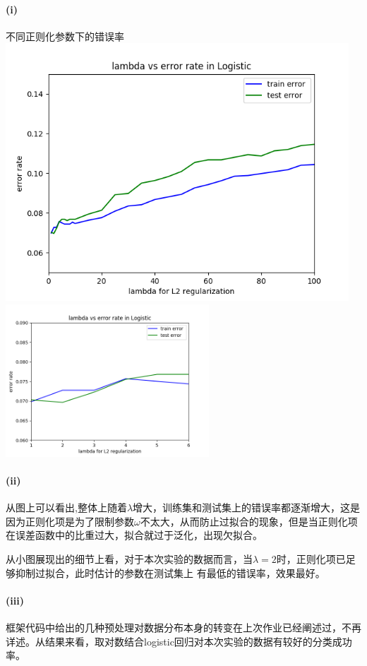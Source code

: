 \documentclass[hyperref,UTF8]{ctexart}
\begin{document}
\paragraph{(i)} 
\par 不同正则化参数下的错误率\\
\includegraphics[height=3.8in]{Logistic-lam.png}\\
\includegraphics[width=3in]{2Logistic-lam.png}
\paragraph{(ii)}从图上可以看出,整体上随着$\lambda$增大，训练集和测试集上的错误率都逐渐增大，这是因为正则化项是为了限制参数$\omega$不太大，从而防止过拟合的现象，但是当正则化项在误差函数中的比重过大，拟合就过于泛化，出现欠拟合。
\par 从小图展现出的细节上看，对于本次实验的数据而言，当$\lambda=2$时，正则化项已足够抑制过拟合，此时估计的参数在测试集上
有最低的错误率，效果最好。
\paragraph{(iii)}框架代码中给出的几种预处理对数据分布本身的转变在上次作业已经阐述过，不再详述。从结果来看，取对数结合logistic回归对本次实验的数据有较好的分类成功率。
\end{document}
